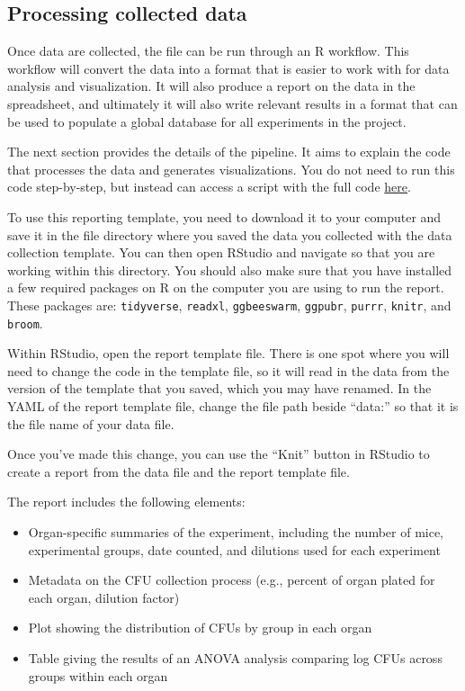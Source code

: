 \documentclass[
]{book}
\providecommand{\tightlist}{%
  \setlength{\itemsep}{0pt}\setlength{\parskip}{0pt}}
\begin{document}
\subsection{Processing collected data}\label{processing-collected-data-1}

Once data are collected, the file can be run through an R workflow. This workflow
will convert the data into a format that is easier to work with for data analysis
and visualization. It will also produce a report on the data in the spreadsheet, and
ultimately it will also write relevant results in a format that can be used
to populate a global database for all experiments in the project.

The next section provides the details of the pipeline. It aims to explain the
code that processes the data and generates visualizations. You do not need to
run this code step-by-step, but instead can access a script with the full
code \href{https://raw.githubusercontent.com/csu-impactb/CODING-TEAM-BOOKDOWN-/main/templates/report_templates/cfu_report.Rmd}{here}.

To use this reporting template, you need to download it to your computer and
save it in the file directory where you saved the data you collected with the
data collection template. You can then open RStudio and navigate so that you are
working within this directory. You should also make sure that you have installed
a few required packages on R on the computer you are using to run the report.
These packages are: \texttt{tidyverse}, \texttt{readxl}, \texttt{ggbeeswarm}, \texttt{ggpubr}, \texttt{purrr},
\texttt{knitr}, and \texttt{broom}.

Within RStudio, open the report template file. There is one spot where you will
need to change the code in the template file, so it will read in the data from
the version of the template that you saved, which you may have renamed.
In the YAML of the report template file, change the file path beside ``data:''
so that it is the file name of your data file.

Once you've made this change, you can use the ``Knit'' button in RStudio to
create a report from the data file and the report template file.

The report includes the following elements:

\begin{itemize}
\tightlist
\item
  Organ-specific summaries of the experiment, including the number of mice,
  experimental groups, date counted, and dilutions used for each experiment
\item
  Metadata on the CFU collection process (e.g., percent of organ plated for
  each organ, dilution factor)
\item
  Plot showing the distribution of CFUs by group in each organ
\item
  Table giving the results of an ANOVA analysis comparing log CFUs
  across groups within each organ
\end{itemize}
\end{document}
